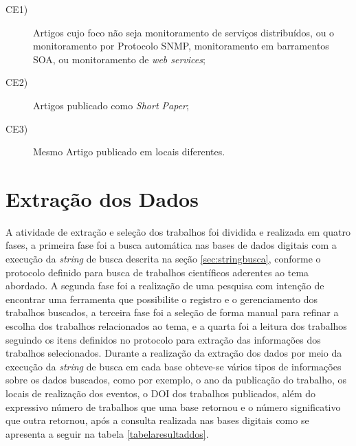 \begin{description}
\item[CE1)]Artigos cujo foco não seja monitoramento de serviços distribuídos, ou o monitoramento por Protocolo \acrshort{SNMP}, monitoramento em barramentos \acrshort{SOA}, ou monitoramento de \textit{web services};
\item[CE2)] Artigos publicado como \textit{Short Paper};
\item[CE3)] Mesmo Artigo publicado em locais diferentes.
\end{description}


\section{Extração dos Dados}
A atividade de extração e seleção dos trabalhos foi dividida e realizada em quatro fases, a primeira fase foi a busca automática nas bases de dados digitais com a execução da \textit{string} de busca descrita na seção \ref{sec:stringbusca}, conforme o protocolo definido para busca de trabalhos científicos aderentes ao tema abordado. A segunda fase foi a realização de uma pesquisa com intenção de encontrar uma ferramenta que possibilite o registro e o gerenciamento dos trabalhos buscados, a terceira fase foi a seleção de forma manual para refinar a escolha dos trabalhos relacionados ao tema, e a quarta foi a leitura dos trabalhos seguindo os itens definidos no protocolo para extração das informações dos trabalhos selecionados. Durante a realização da extração dos dados por meio da execução da \textit{string} de busca em cada base obteve-se vários tipos de informações sobre os dados buscados, como por exemplo, o ano da publicação do trabalho, os locais de realização dos eventos, o \acrshort{DOI} dos trabalhos publicados, além do  expressivo número de trabalhos que uma base retornou e o número significativo que outra retornou, após a consulta realizada nas bases digitais como se apresenta a seguir na tabela \ref{tabelaresultaddos}.

